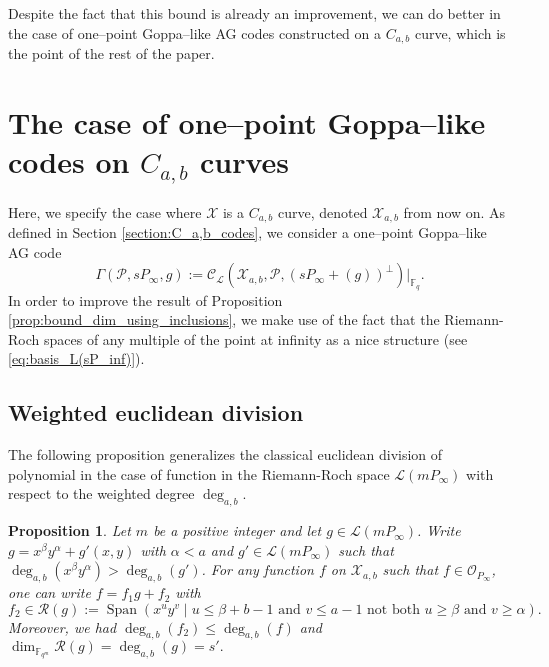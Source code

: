 \documentclass[a4paper]{article}
\newtheorem{proposition}[thm]{Proposition}
\theoremstyle{definition}
\theoremstyle{remark}
\newcommand{\calP}{\mathcal{P}}
\newcommand{\calL}{\mathcal{L}}
\newcommand{\calC}{\mathcal{C}}
\newcommand{\calO}{\mathcal{O}}
\newcommand{\calR}{\mathcal{R}}
\newcommand{\calX}{\mathcal{X}}
\newcommand{\fqm}{\mathbb{F}_{q^m}}
\newcommand{\fq}{\mathbb{F}_{q}}
\newcommand{\Span}[1]{\operatorname{Span}\left(#1\right)}
\newcommand{\degab}[1]{\deg_{a,b}\left(#1\right)}
\begin{document}
Despite the fact that this bound is already an improvement, we can do better in the case of one--point Goppa--like AG codes constructed on a $C_{a,b}$ curve, which is the point of the rest of the paper.

\section{The case of one--point Goppa--like codes on $C_{a,b}$ curves}

Here, we specify the case where $\calX$ is a $C_{a,b}$ curve, denoted $\calX_{a,b}$ from now on. As defined in Section \ref{section:C_a,b_codes}, we consider a one--point Goppa--like AG code
\[\Gamma(\calP,sP_\infty,g) := \calC_{\calL}(\calX_{a,b},\calP,(sP_\infty+(g))^{\perp})|_{\fq}.\]
In order to improve the result of Proposition \ref{prop:bound_dim_using_inclusions}, we make use of the fact that the Riemann-Roch spaces of any multiple of the point at infinity as a nice structure (see \ref{eq:basis_L(sP_inf)}). 



\subsection{Weighted euclidean division}

\noindent The following proposition generalizes the classical euclidean division of polynomial in the case of function in the Riemann-Roch space $\calL(mP_\infty)$ with respect to the weighted degree $\deg_{a,b}$.

\begin{proposition}\label{prop:div_grob}
Let $m$ be a positive integer and let $g \in \calL(m P_\infty)$. Write $g=x^\beta y^\alpha +g'(x,y)$ with $\alpha < a$ and $g' \in \calL(m P_\infty)$ such that $\degab{x^\beta y^\alpha}>\degab{g'}$.
For any function $f$ on $\calX_{a,b}$ such that $f \in \calO_{P_\infty}$, one can write $f=f_1g+f_2$ with 
\[f_2 \in \calR(g):= \Span{x^u y^v \mid u \leq \beta + b-1 \text{ and } v\leq a-1 \text{ not both }  u \geq \beta \text{ and } v \geq \alpha}.\]
Moreover, we had $\degab{f_2} \leq \degab{f}$ and $\dim_{\fqm} \calR(g) = \degab{g}=s'.$ 
\end{proposition}
\end{document}
